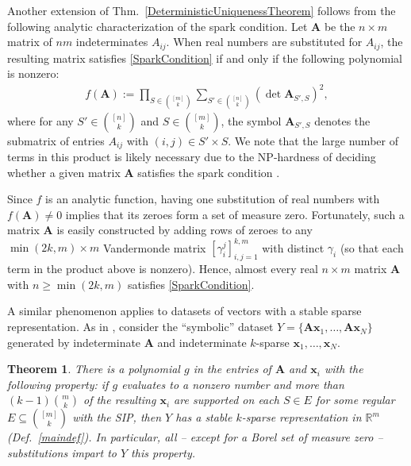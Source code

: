\documentclass[9pt,twocolumn]{pnas-new}
\newtheorem{theorem}{Theorem}
\begin{document}
Another extension of Thm.~\ref{DeterministicUniquenessTheorem} follows from the following analytic characterization of the spark condition.  Let $\mathbf{A}$  be the $n \times m$ matrix of $nm$ indeterminates $A_{ij}$. When real numbers are substituted for $A_{ij}$, the resulting matrix satisfies \eqref{SparkCondition} if and only if the following polynomial is nonzero:
\begin{align*}
f(\mathbf{A}) := \prod_{S \in {[m] \choose k}} \sum_{S' \in {[n] \choose k}} (\det \mathbf{A}_{S',S})^2,
\end{align*}
%
where for any $S' \in {[n] \choose k}$ and $S \in {[m] \choose k}$, the symbol $\mathbf{A}_{S',S}$ denotes the submatrix of entries $A_{ij}$ with $(i,j) \in S' \times S$.   We note that the large number of terms in this product is likely necessary due to the NP-hardness of deciding whether a given matrix $\mathbf{A}$ satisfies the spark condition \cite{tillmann2014computational}.

Since $f$ is an analytic function, having one substitution of real numbers with $f(\mathbf{A}) \neq 0$ implies that its zeroes form a set of measure zero. Fortunately, such a matrix $\mathbf{A}$ is easily constructed by adding rows of zeroes to any $\min(2k,m) \times m$ Vandermonde matrix $[\gamma_i^j]_{i,j=1}^{k,m}$ with distinct $\gamma_i$ (so that each term in the product above is nonzero).
Hence, almost every real $n \times m$ matrix $\mathbf{A}$ with $n \geq \min(2k,m)$ satisfies \eqref{SparkCondition}.

A similar phenomenon applies to datasets of vectors with a stable sparse representation. As in \cite[Sec.~IV]{Hillar15}, consider the ``symbolic'' dataset $Y = \{\mathbf{A}\mathbf{x}_1,\ldots,\mathbf{A} \mathbf{x}_N\}$ generated by indeterminate $\mathbf{A}$ and indeterminate $k$-sparse $\mathbf{x}_1, \ldots, \mathbf{x}_N$.  

\begin{theorem}\label{robustPolythm}
There is a polynomial $g$ in the entries of $\mathbf{A}$ and $\mathbf{x}_i$ with the following property:  if $g$ evaluates to a nonzero number and more than \mbox{$(k-1){m \choose k}$} of the resulting $\mathbf{x}_i$ are supported on each $S \in E$ for some regular $E \subseteq {[m] \choose k}$ with the SIP, then $Y$ has a stable $k$-sparse representation in $\mathbb{R}^m$ (Def.~\ref{maindef}). In particular, all -- except for a Borel set of measure zero -- substitutions impart to $Y$ this property.
\end{theorem}
\end{document}
